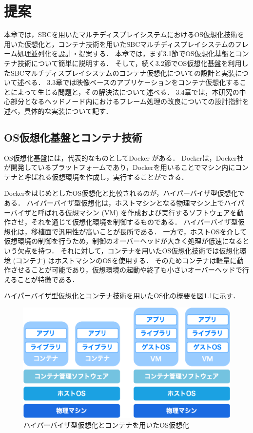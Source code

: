\chapter{提案}
本章では，SBCを用いたマルチディスプレイシステムにおけるOS仮想化技術を用いた仮想化と，コンテナ技術を用いたSBCマルチディスプレイシステムのフレーム処理並列化を設計・提案する．
本章では，まず3.1節でOS仮想化基盤とコンテナ技術について簡単に説明する．
そして，続く3.2節でOS仮想化基盤を利用したSBCマルチディスプレイシステムのコンテナ仮想化についての設計と実装について述べる．
3.3章では映像ベースのアプリケーションをコンテナ仮想化することによって生じる問題と，その解決法について述べる．
3.4章では，本研究の中心部分となるヘッドノード内におけるフレーム処理の改良についての設計指針を述べ，具体的な実装について記す．

\section{OS仮想化基盤とコンテナ技術}
OS仮想化基盤には，代表的なものとしてDocker \cite{docker}がある．
Dockerは，Docker社が開発しているプラットフォームであり，Dockerを用いることでマシン内にコンテナと呼ばれる仮想環境を作成し，実行することができる．

DockerをはじめとしたOS仮想化と比較されるのが，ハイパーバイザ型仮想化である．
ハイパーバイザ型仮想化は，ホストマシンとなる物理マシン上でハイパーバイザと呼ばれる仮想マシン (VM) を作成および実行するソフトウェアを動作させ，それを通じて仮想化環境を制御するものである．
ハイパーバイザ型仮想化は，移植面で汎用性が高いことが長所である．
一方で，ホストOSを介して仮想環境の制御を行うため，制御のオーバーヘッドが大きく処理が低速になるという欠点を持つ．
それに対して，コンテナを用いたOS仮想化技術では仮想化環境 (コンテナ) はホストマシンのOSを使用する．
そのためコンテナは軽量に動作させることが可能であり，仮想環境の起動や終了も小さいオーバーヘッドで行えることが特徴である．

ハイパーバイザ型仮想化とコンテナ技術を用いたOS化の概要を図\ref{docker}に示す．

\begin{figure}[H]
    \hspace*{\fill}
    \includegraphics[width=\linewidth]{./fig/chap3/docker.eps}
    \hspace*{\fill}
    \caption{ハイパーバイザ型仮想化とコンテナを用いたOS仮想化}
    \label{docker}
\end{figure}


